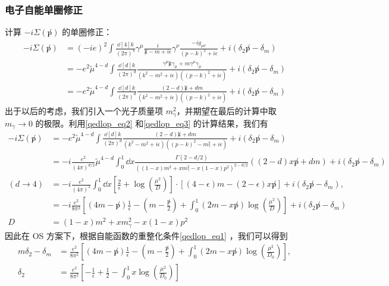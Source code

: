 \subsubsection{电子自能单圈修正}
计算 $-i\Sigma(\not p)$ 的单圈修正：
\begin{equation}
\begin{aligned}
-i\Sigma(\not p)
&=(-ie)^2 \int\frac{\dd[4]{k}}{(2\pi)^4} \gamma^\mu\frac{i}{\not k-m+i\epsilon} \gamma^\nu  \frac{-ig_{\mu\nu}}{(p-k)^2+i\epsilon}+i(\delta_2\not p -\delta_m)\\
&=-e^2\tilde{\mu}^{4-d} \int\frac{\dd[d]{k}}{(2\pi)^d} \frac{\gamma^\mu \not k \gamma_\mu + m\gamma^\mu\gamma_\mu}{(k^2-m^2+i\epsilon)((p-k)^2+i\epsilon)}+i(\delta_2\not p -\delta_m)
\\
&=-e^2\tilde{\mu}^{4-d} \int\frac{\dd[d]{k}}{(2\pi)^d} \frac{(2-d)\not k + dm}{(k^2-m^2+i\epsilon)((p-k)^2+i\epsilon)}+i(\delta_2\not p -\delta_m)
\end{aligned}
\end{equation}
出于以后的考虑，我们引入一个光子质量项 $m_\gamma^2$，并期望在最后的计算中取 $m_\gamma\rightarrow 0$ 的极限。利用\autoref{qedlop_eq2} 和\autoref{qedlop_eq3} 的计算结果，我们有
\begin{equation}
\begin{aligned}
-i\Sigma(\not p)
&=-e^2\tilde{\mu}^{4-d} \int\frac{\dd[d]{k}}{(2\pi)^d} \frac{(2-d)\not k + dm}{(k^2-m^2+i\epsilon)((p-k)^2-m_\gamma^2+i\epsilon)}+i(\delta_2\not p -\delta_m)
\\
&= -i\frac{e^2}{(4\pi)^{d/2}}\tilde{\mu}^{4-d}
\int_0^1 \dd x \frac{\Gamma(2-d/2)}{((1-x)m^2+x m_\gamma^2-x(1-x)p^2)^{2-d/2}}((2-d)x\not p+dm)
+i(\delta_2\not p -\delta_m)
\\
(d\rightarrow 4)&= -i\frac{e^2}{(4\pi)^2}  \int_0^1 \dd x \left[\frac{2}{\epsilon}+\log\left(\frac{\mu^2}{D}\right)\right]\cdot \left[(4-\epsilon)m -(2-\epsilon)x\not p\right]
+i(\delta_2\not p -\delta_m),\\
&=-i\frac{e^2}{8\pi^2}\left[(4m-\not p)\frac{1}{\epsilon}-\left(m-\frac{\not p}{2}\right)+ \int_0^1 (2m-x\not p)\log\left(\frac{\mu^2}{D}\right) \right]
+i(\delta_2\not p -\delta_m)\\
D&=(1-x)m^2+xm_\gamma^2-x(1-x)p^2
\end{aligned}
\end{equation}
因此在 OS 方案下，根据自能函数的重整化条件\autoref{qedlop_eq1} ，我们可以得到
\begin{equation}
\begin{aligned}
m\delta_2 - \delta_m &= \frac{e^2}{8\pi^2}\left[(4m-\not p)\frac{1}{\epsilon}-\left(m-\frac{\not p}{2}\right)+ \int_0^1 (2m-x\not p)\log\left(\frac{\mu^2}{D_0}\right) \right],\\
\delta_2 &= \frac{e^2}{8\pi^2}\left[-\frac{1}{\epsilon}+\frac{1}{2}-\int_0^1 x\log\left(\frac{\mu^2}{D_0}\right) \right]
\end{aligned}
\end{equation}


